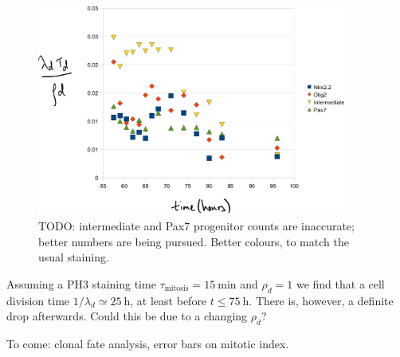 \documentclass[10pt,english]{article}
\begin{document}
\begin{figure}[h]
	\begin{center}
		\includegraphics[width=4in]{consistency-mitotic-index.png}
	\end{center}
	\caption{TODO: intermediate and Pax7 progenitor counts are inaccurate; better numbers are being pursued. Better colours, to match the usual staining.}
\end{figure}


Assuming a PH3 staining time $\tau_\textrm{mitosis} = \SI{15}{\minute}$ and $\rho_d = 1$ we find that a cell division time $1/\lambda_d \simeq \SI{25}{\hour}$, at least before $t \le \SI{75}{\hour}$. There is, however, a definite drop afterwards. Could this be due to a changing $\rho_d$?

To come: clonal fate analysis, error bars on mitotic index.
\end{document}
